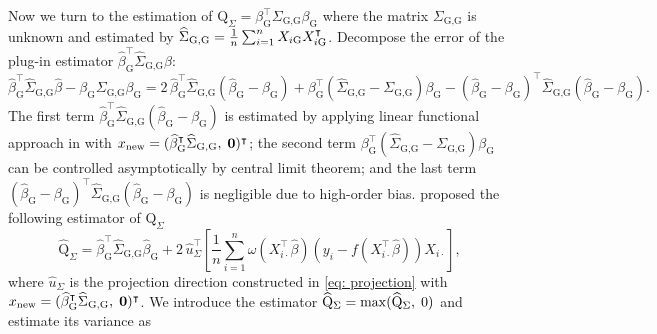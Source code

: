 Now we turn to the estimation of $\mathrm{Q}_{\Sigma} = \beta_{\textrm{G}}^\intercal \Sigma_{{\textrm{G,G}}} \beta_{\textrm{G}}$ where the matrix $\Sigma_{{\textrm{G,G}}}$ is unknown and  estimated by $\widehat{\Sigma}_{\mathrm{G},\mathrm{G}} = \frac{1}{n}\sum_{i=1}^{n}X_{i\mathrm{G}}X_{i\mathrm{G}}^{\intercal}$. %
Decompose the error of the plug-in estimator $\widehat{\beta}_{\textrm{G}}^\intercal \widehat{\Sigma}_{\textrm{G,G}} \widehat{\beta}$:
\begin{equation*}
    \widehat{\beta}_{\textrm{G}}^\intercal \widehat{\Sigma}_{\textrm{G,G}} \widehat{\beta} - \beta_{\textrm{G}} \Sigma_{{\textrm{G,G}}} \beta_{\textrm{G}} = 2\, \widehat{\beta}_{\textrm{G}}^\intercal \widehat{\Sigma}_{\textrm{G,G}} (\widehat{\beta}_{\textrm{G}} - \beta_{\textrm{G}}) + \beta_{\textrm{G}}^\intercal (\widehat{\Sigma}_{\textrm{G,G}} - \Sigma_{{\textrm{G,G}}})\beta_{\textrm{G}} - (\widehat{\beta}_{\textrm{G}} - \beta_{\textrm{G}})^\intercal \widehat{\Sigma}_{\textrm{G,G}} (\widehat{\beta}_{\textrm{G}} - \beta_{\textrm{G}}).
\end{equation*}
The first term $\widehat{\beta}_{\textrm{G}}^\intercal \widehat{\Sigma}_{\textrm{G,G}} (\widehat{\beta}_{\textrm{G}} - \beta_{\textrm{G}})$ is estimated by applying linear functional approach in  with $x_{\rm new} = ( \widehat{\beta}_{\textrm{G}}^\intercal \widehat{\Sigma}_{\mathrm{G}, \mathrm{G}}, \; \mathbf{0})^\intercal$; 
the second term $\beta_{\textrm{G}}^\intercal (\widehat{\Sigma}_{\textrm{G,G}} - \Sigma_{{\textrm{G,G}}})\beta_{\textrm{G}}$ can be controlled asymptotically by central limit theorem;
and the last term $(\widehat{\beta}_{\textrm{G}} - \beta_{\textrm{G}})^\intercal \widehat{\Sigma}_{\textrm{G,G}} (\widehat{\beta}_{\textrm{G}} - \beta_{\textrm{G}})$ is negligible due to high-order bias. \citet{guo2021group} proposed the following estimator of $\mathrm{Q}_\Sigma$
\begin{equation*}
    \widehat{\mathrm{Q}}_{\Sigma} = \widehat{\beta}_{\textrm{G}}^\intercal \widehat{\Sigma}_{\textrm{G,G}} \widehat{\beta}_{\textrm{G}} + 2\, \widehat{u}_\Sigma^\intercal \left[ \frac{1}{n} \sum_{i=1}^n \omega(X_{i\cdot}^\intercal \widehat{\beta}) \left(y_i - f(X_{i\cdot}^\intercal \widehat{\beta})\right) X_{i\cdot} \right],  
\end{equation*}
where $\widehat{u}_\Sigma$ is the projection direction constructed in \eqref{eq: projection} with $x_{\rm new} = (\widehat{\beta}^\intercal_{\textrm{G}} \widehat{\Sigma}_{\textrm{G,G}}, \; \mathbf{0})^\intercal$. We introduce the estimator $\widehat{\rm Q}_\Sigma = \max(\widehat{\rm Q}_\Sigma,\; 0)$ and estimate its variance as 
